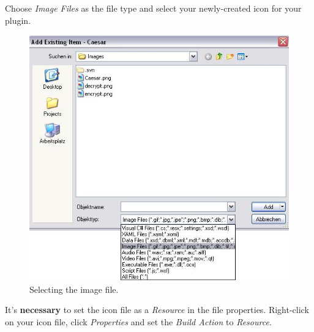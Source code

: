 Choose \textit{Image Files} as the file type and select your newly-created icon for your plugin.

\begin{figure}[h!]
	\centering
		\includegraphics{figures/choose_icon.jpg}
	\caption{Selecting the image file.}
	\label{fig:choose_icon}
\end{figure}
\clearpage

It's \textbf{necessary} to set the icon file as a \textit{Resource} in the file properties. Right-click on your icon file, click \textit{Properties} and set the \textit{Build Action} to \textit{Resource}.

